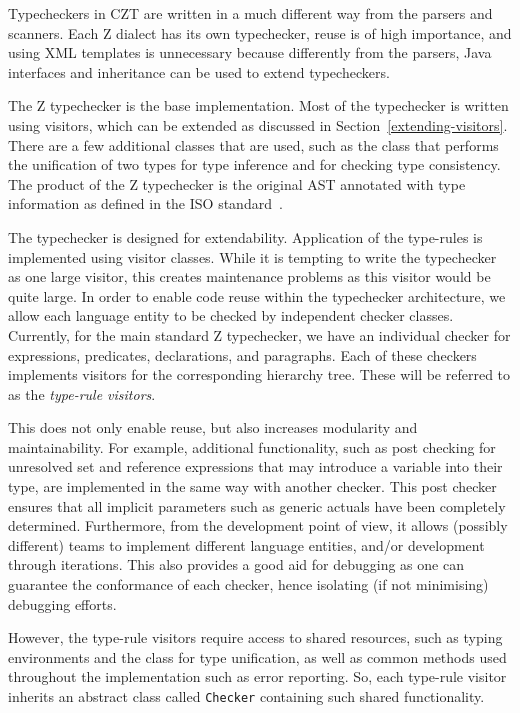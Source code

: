 \documentclass{llncs}
\begin{document}
Typecheckers in CZT are written in a much different way from the parsers
and scanners. Each Z dialect has its own typechecker, reuse
is of high importance, and using XML templates is unnecessary because
differently from the parsers, Java interfaces and inheritance can be used to
extend typecheckers.

The Z typechecker is the base implementation. Most of the typechecker
is written using visitors, which can be extended as discussed in
Section~\ref{extending-visitors}. There are a few additional classes
that are used, such as the class that performs the unification of two
types for type inference and for checking type consistency.
The product of the Z typechecker is the original AST annotated with type
information as defined in the ISO standard~\cite[Section~10]{isoz}.

The typechecker is designed for extendability. Application of the type-rules
is implemented using visitor classes. While it is tempting to
write the typechecker as one large visitor, this creates maintenance
problems as this visitor would be quite large.
In order to enable code reuse within the typechecker architecture, we
allow each language entity to be checked by independent checker classes.
Currently, for the main standard Z typechecker, we have an individual checker
for expressions, predicates, declarations, and paragraphs. Each of these checkers
implements visitors for the corresponding hierarchy tree.
These will be referred to as the {\em type-rule visitors}.

This does not only enable reuse, but also increases modularity and maintainability.
For example, additional functionality, such as post checking for unresolved set and
reference expressions that may introduce a variable into their type, are implemented in
the same way with another checker. This post checker ensures that all implicit
parameters such as generic actuals have been completely determined.
Furthermore, from the development point of view, it allows (possibly different) teams
to implement different language entities, and/or development through iterations.
This also provides a good aid for debugging as one can guarantee the conformance of each
checker, hence isolating (if not minimising) debugging efforts.

However, the type-rule visitors require access to shared resources,
such as typing environments and the class for type unification, as well as
common methods used throughout the implementation such as error reporting.
So, each type-rule visitor inherits an abstract class called {\tt Checker}
containing such shared functionality.
\end{document}
